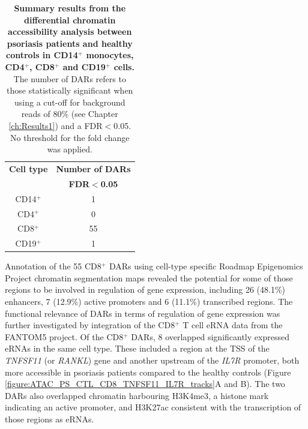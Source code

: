 \begin{table}[htbp]
\centering
\begin{tabular}{@{} c c}
\toprule
\textbf{Cell type}   & \textbf{Number of DARs} \\
                     & \textbf{FDR$<$0.05}     \\
\midrule
\midrule
CD14$^+$             & 1 \\                 
CD4$^+$              & 0 \\
CD8$^+$              & 55 \\
CD19$^+$             & 1 \\
\bottomrule 
\end{tabular}
\medskip %
\caption[Summary results from the differential chromatin accessibility analysis between psoriasis patients and healthy controls in CD14$^+$ monocytes, CD4$^+$, CD8$^+$ and CD19$^+$ cells.]{\textbf{Summary results from the differential chromatin accessibility analysis between psoriasis patients and healthy controls in CD14$^+$ monocytes, CD4$^+$, CD8$^+$ and CD19$^+$ cells.} The number of DARs refers to those statistically significant when using a cut-off for background reads of 80\% (see Chapter \ref{ch:Results1}) and a FDR$<$0.05. No threshold for the fold change was applied.}
\label{tab:ATAC_PS_CTL_differential_analysis_results}
\end{table}
\bigskip %


Annotation of the 55 CD8$^+$ DARs using cell-type specific Roadmap Epigenomics Project chromatin segmentation maps revealed the potential for some of those regions to be involved in regulation of gene expression, including 26 (48.1\%) enhancers, 7 (12.9\%) active promoters and 6 (11.1\%) transcribed regions. The functional relevance of DARs in terms of regulation of gene expression was further investigated by integration of the CD8$^+$ T cell eRNA data from the FANTOM5 project. Of the CD8$^+$ DARs, 8 overlapped significantly expressed eRNAs in the same cell type. These included a region at the TSS of the \textit{TNFSF11} (or \textit{RANKL}) gene and another upstream of the \textit{IL7R} promoter, both more accessible in psoriasis patients compared to the healthy controls (Figure \ref{figure:ATAC_PS_CTL_CD8_TNFSF11_IL7R_tracks}A and B). The two DARs also overlapped chromatin harbouring H3K4me3, a histone mark indicating an active promoter, and H3K27ac consistent with the transcription of those regions as eRNAs.

